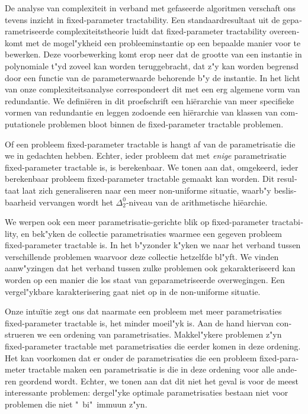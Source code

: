 {\begin{otherlanguage}{dutch}
De analyse van complexiteit in verband met gefaseerde algoritmen verschaft ons tevens inzicht in fixed-parameter tractability.
Een standaardresultaat uit de geparametriseerde complexiteitstheorie luidt dat fixed-parameter tractability overeenkomt met de mogel"ykheid een probleeminstantie op een bepaalde manier voor te bewerken.
Deze voorbewerking komt erop neer dat de grootte van een instantie in polynomiale t"yd zoveel kan worden teruggebracht, dat z"y kan worden begrensd door een functie van de parameterwaarde behorende b"y de instantie.
In het licht van onze complexiteitsanalyse correspondeert dit met een erg algemene vorm van redundantie.
We defini{\"e}ren in dit proefschrift een hi{\"e}rarchie  van meer specifieke vormen van redundantie en leggen zodoende een hi{\"e}rarchie van klassen van computationele problemen bloot binnen de fixed-parameter tractable problemen.

Of een probleem fixed-parameter tractable is hangt af van de parametrisatie die we in gedachten hebben.
Echter, ieder probleem dat met \emph{enige} parametrisatie fixed-parameter tractable is, is berekenbaar.
We tonen aan dat, omgekeerd, ieder berekenbaar probleem fixed-parameter tractable gemaakt kan worden.
Dit resultaat laat zich generaliseren naar een meer non-uniforme situatie, waarb"y beslisbaarheid vervangen wordt het $\Delta^0_2$-niveau van de arithmetische hi{\"e}archie.

We werpen ook een meer parametrisatie-gerichte blik op fixed-parameter tractability, en bek"yken de collectie parametrisaties waarmee een gegeven probleem fixed-parameter tractable is.
In het b"yzonder k"yken we naar het verband tussen verschillende problemen waarvoor deze collectie hetzelfde bl"yft.
We vinden aanw"yzingen dat het verband tussen zulke problemen ook gekarakteriseerd kan worden op een manier die los staat van geparametriseerde overwegingen.
Een vergel"ykbare karakterisering gaat niet op in de non-uniforme situatie.

Onze intu{\"i}tie zegt ons dat naarmate een probleem met meer parametrisaties fixed-parameter tractable is, het minder moeil"yk is.
Aan de hand hiervan construeren we een ordening van parametrisaties.
Makkel"ykere problemen z"yn fixed-parameter tractable met parametrisaties die eerder komen in deze ordening.
Het kan voorkomen dat er onder de parametrisaties die een probleem fixed-parameter tractable maken een parametrisatie is die in deze ordening voor alle anderen geordend wordt.
Echter, we tonen aan dat dit niet het geval is voor de meest interessante problemen: dergel"yke optimale parametrisaties bestaan niet voor problemen die niet "~bi"~immuun z"yn.

\end{otherlanguage}}
